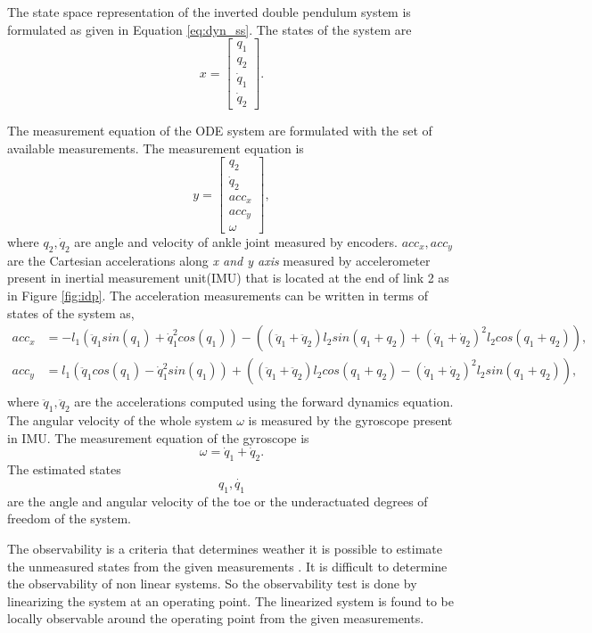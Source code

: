 The state space representation of the inverted double pendulum system is formulated as given in Equation \ref{eq:dyn_ss}. The states of the system are $$ x = \begin{bmatrix} q_1 \\ q_2 \\ \dot q_1  \\ \dot q_2 \end{bmatrix}. $$

The measurement equation of the ODE system are formulated with the set of available measurements. The measurement equation is  
\begin{equation}
    \label{eq:y_idp}
	y= \begin{bmatrix} q_2 \\ \dot q_2 \\ acc_x \\ acc_y \\ \omega \end{bmatrix},
\end{equation}
where $q_2, \dot{q}_2$ are  angle and velocity of ankle joint measured by encoders. $acc_{x},acc_{y} $ are the Cartesian accelerations along \emph{x and y axis} measured by accelerometer present in inertial measurement unit(IMU) that is located at the end of link 2 as in Figure \ref{fig:idp}. The acceleration measurements can be written in terms of states of the system as,
\begin{equation} 
	\label{eq:idp_acc_imu}
    \begin{aligned}
    acc_x &= -l_1 (\ddot q_1 sin(q_1) + \dot q_1^2 cos(q_1)) - ((\ddot q_1 + \ddot q_2) l_2 sin(q_1+q_2) + (\dot q_1 + \dot q_2)^2 l_2 cos(q_1+q_2)), \\
    acc_y &= l_1 (\ddot q_1 cos(q_1) - \dot q_1^2 sin(q_1)) + ((\ddot q_1 + \ddot q_2) l_2 cos(q_1+q_2) - (\dot q_1 + \dot q_2)^2 l_2 sin(q_1+q_2)), \\
    \end{aligned}
\end{equation}
where $\ddot q_1 , \ddot q_2 $ are the accelerations computed using the forward dynamics equation. The angular velocity of the whole system $\omega$ is measured by the gyroscope present in IMU. The measurement equation of the gyroscope is $$ \omega = \dot q_1 + \dot q_2. $$ 
The estimated states $$q_1, \dot{q_1}$$ are the angle and angular velocity of the toe or the underactuated degrees of freedom of the system.

The observability is a criteria that determines weather it is possible to estimate the unmeasured states from the given measurements \citep{gre01}. It is difficult to determine the observability of non linear systems. So the observability test is done by linearizing the system at an operating point. The linearized system is found to be locally observable around the operating point from the given measurements. 


